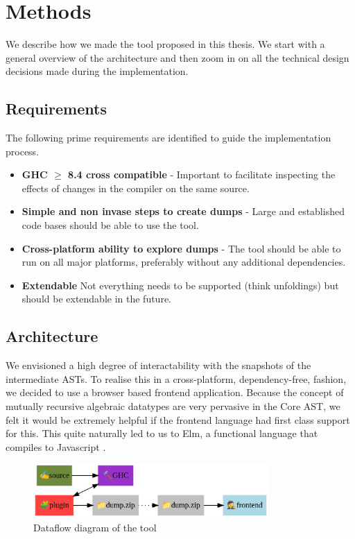 \chapter{Methods}

We describe how we made the tool proposed in this thesis. We start with a general overview
of the architecture and then zoom in on all the technical design decisions made during the implementation.

\section{Requirements}

The following prime requirements are identified to guide the implementation process.

\begin{itemize}
  \item \textbf{GHC $\geq$ 8.4 cross compatible} - Important to facilitate inspecting the effects of changes in the compiler on the same source.
  \item \textbf{Simple and non invase steps to create dumps} - Large and established code bases should be able to use the tool.
  \item \textbf{Cross-platform ability to explore dumps} - The tool should be able to run on all major platforms, preferably without any additional dependencies.
  \item \textbf{Extendable} Not everything needs to be supported (think unfoldings) but should be extendable in the future.
\end{itemize}

\section{Architecture}

We envisioned a high degree of interactability with the snapshots of the intermediate ASTs. To realise this
in a cross-platform, dependency-free, fashion, we decided to use a browser based frontend application. 
Because the concept of mutually recursive algebraic datatypes are very pervasive in the Core AST, we felt it would be 
extremely helpful if the frontend language had first class support for this. This quite naturally led to us to Elm, a functional language
that compiles to Javascript \cite{elm_lang}.

\begin{figure}[h]
  \centering
  \includegraphics[width=0.8\textwidth]{figs/architecture.png}
  \caption{Dataflow diagram of the tool}
  \label{fig:architecture}
\end{figure}


